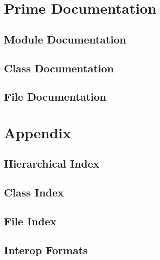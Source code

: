 \part{Prime Documentation}
\chapter{Module Documentation}







\chapter{Class Documentation}








\chapter{File Documentation}




\part{Appendix}
\chapter{Hierarchical Index}

\chapter{Class Index}

\chapter{File Index}

\chapter{Interop Formats}
\label{_interop_types}
\hypertarget{_interop_types}{}


\newpage
{}
{}
\printindex


